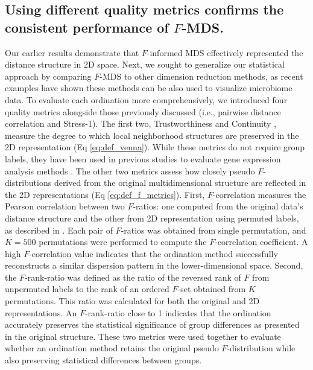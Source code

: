 \documentclass[10pt,letterpaper]{article}
\newcommand{\1}{{\rm 1}\kern-0.24em{\rm I}}
\providecommand{\DIFaddtex}[1]{{\protect\color{blue}\uwave{#1}}} %
\providecommand{\DIFaddbegin}{} %
\providecommand{\DIFaddend}{} %
\providecommand{\DIFadd}[1]{\texorpdfstring{\DIFaddtex{#1}}{#1}} %
\newcommand{\DIFaddincludegraphics}[2][]{{\color{blue}\fbox{\DIFOincludegraphics[#1]{#2}}}} %
\DeclareRobustCommand{\DIFaddbegin}{\DIFOaddbegin \let\includegraphics\DIFaddincludegraphics} %
\DeclareRobustCommand{\DIFaddend}{\DIFOaddend \let\includegraphics\DIFOincludegraphics} %
\begin{document}
\subsection*{Using different quality metrics confirms the consistent performance of $F$-MDS.}
Our earlier results demonstrate that $F$-informed MDS effectively represented the distance structure in 2D space. Next, we sought to generalize our statistical approach by comparing $F$-MDS to other dimension reduction methods, as recent examples have shown these methods can be also used to visualize microbiome data. To evaluate each ordination more comprehensively, we introduced four quality metrics alongside those previously discussed (i.e., pairwise distance correlation and Stress-1\DIFaddbegin \DIFadd{, see ``Performance evaluation metrics'' in Methods}\DIFaddend ). The first two, Trustworthiness and Continuity \cite{Venna01}, measure the degree to which local neighborhood structures are preserved in the 2D representation (Eq \ref{eq:def_venna}). While these metrics do not require group labels, they have been used in previous studies to evaluate gene expression analysis methods \cite{Nikkila02, Kaski03}. The other two metrics assess how closely pseudo $F$-distributions derived from the original multidimensional structure are reflected in the 2D representations (Eq \ref{eq:def_f_metrics}). First, $F$-correlation measures the Pearson correlation between two $F$-ratios: one computed from the original data's distance structure and the other from 2D representation using permuted labels, as described in \cite{Serviss17}. Each pair of $F$-ratios was obtained from single permutation, and $K=500$ permutations were performed to compute the $F$-correlation coefficient. A high $F$-correlation value indicates that the ordination method successfully reconstructs a similar dispersion pattern in the lower-dimensional space. Second, the $F$-rank-ratio was defined as the ratio of the reversed rank of $F$ from unpermuted labels to the rank of an ordered $F$-set obtained from $K$ permutations. This ratio was calculated for both the original and 2D representations. An $F$-rank-ratio close to 1 indicates that the ordination accurately preserves the statistical significance of group differences as presented in the original structure. These two metrics were used together to evaluate whether an ordination method retains the original pseudo $F$-distribution while also preserving statistical differences between groups.
\end{document}
